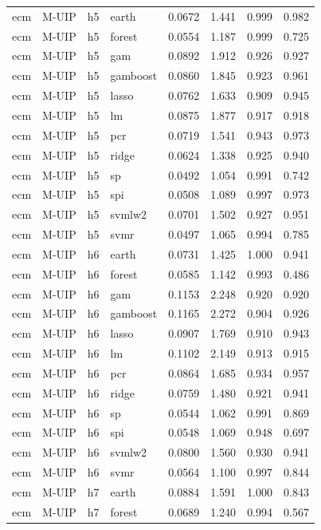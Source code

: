\begin{ThreePartTable}
\begin{longtable}[t]{llclcccc}
\addlinespace
ecm & M-UIP & h5 & earth & 0.0672 & 1.441 & 0.999 & 0.982\\
ecm & M-UIP & h5 & forest & 0.0554 & 1.187 & 0.999 & 0.725\\
ecm & M-UIP & h5 & gam & 0.0892 & 1.912 & 0.926 & 0.927\\
ecm & M-UIP & h5 & gamboost & 0.0860 & 1.845 & 0.923 & 0.961\\
ecm & M-UIP & h5 & lasso & 0.0762 & 1.633 & 0.909 & 0.945\\
ecm & M-UIP & h5 & lm & 0.0875 & 1.877 & 0.917 & 0.918\\
ecm & M-UIP & h5 & pcr & 0.0719 & 1.541 & 0.943 & 0.973\\
ecm & M-UIP & h5 & ridge & 0.0624 & 1.338 & 0.925 & 0.940\\
ecm & M-UIP & h5 & sp & 0.0492 & 1.054 & 0.991 & 0.742\\
ecm & M-UIP & h5 & spi & 0.0508 & 1.089 & 0.997 & 0.973\\
ecm & M-UIP & h5 & svmlw2 & 0.0701 & 1.502 & 0.927 & 0.951\\
ecm & M-UIP & h5 & svmr & 0.0497 & 1.065 & 0.994 & 0.785\\
\addlinespace
ecm & M-UIP & h6 & earth & 0.0731 & 1.425 & 1.000 & 0.941\\
ecm & M-UIP & h6 & forest & 0.0585 & 1.142 & 0.993 & 0.486\\
ecm & M-UIP & h6 & gam & 0.1153 & 2.248 & 0.920 & 0.920\\
ecm & M-UIP & h6 & gamboost & 0.1165 & 2.272 & 0.904 & 0.926\\
ecm & M-UIP & h6 & lasso & 0.0907 & 1.769 & 0.910 & 0.943\\
ecm & M-UIP & h6 & lm & 0.1102 & 2.149 & 0.913 & 0.915\\
ecm & M-UIP & h6 & pcr & 0.0864 & 1.685 & 0.934 & 0.957\\
ecm & M-UIP & h6 & ridge & 0.0759 & 1.480 & 0.921 & 0.941\\
ecm & M-UIP & h6 & sp & 0.0544 & 1.062 & 0.991 & 0.869\\
ecm & M-UIP & h6 & spi & 0.0548 & 1.069 & 0.948 & 0.697\\
ecm & M-UIP & h6 & svmlw2 & 0.0800 & 1.560 & 0.930 & 0.941\\
ecm & M-UIP & h6 & svmr & 0.0564 & 1.100 & 0.997 & 0.844\\
\addlinespace
ecm & M-UIP & h7 & earth & 0.0884 & 1.591 & 1.000 & 0.843\\
ecm & M-UIP & h7 & forest & 0.0689 & 1.240 & 0.994 & 0.567\\

\end{longtable}
\end{ThreePartTable}

